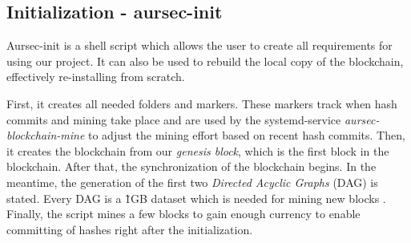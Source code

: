 \subsection{Initialization - aursec-init}\label{sec:aursec-init}
Aursec-init is a shell script which allows the user to create all requirements for using our project.
It can also be used to rebuild the local copy of the blockchain, effectively re-installing from scratch.

First, it creates all needed folders and markers.
These markers track when hash commits and mining take place and are used by the systemd-service \textit{aursec-blockchain-mine} to adjust the mining effort based on recent hash commits.
Then, it creates the blockchain from our \emph{genesis block}, which is the first block in the blockchain.
After that, the synchronization of the blockchain begins.
In the meantime, the generation of the first two \emph{Directed Acyclic Graphs} (DAG) is stated.
Every DAG is a \~1GB dataset which is needed for mining new blocks \cite{wiki:DAG}.
Finally, the script mines a few blocks to gain enough currency to enable committing of hashes right after the initialization.
